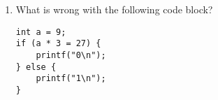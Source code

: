 \documentclass{article}
\begin{document}
\begin{enumerate}
\begin{enumerate}
\item Given your function definition above, give the output of the following code block:
\begin{lstlisting}[style=CStyle]
int a = 4;
int b = 9;
if (is_even(a + b)) {
    printf("Even\n");
} else {
    printf("Odd\n");
}
\end{lstlisting}
\end{enumerate}

\item What is wrong with the following code block?
\begin{lstlisting}[style=CStyle]
int a = 9;
if (a * 3 = 27) {
    printf("0\n");
} else {
    printf("1\n");
}
\end{lstlisting}
\end{enumerate}
\end{document}

